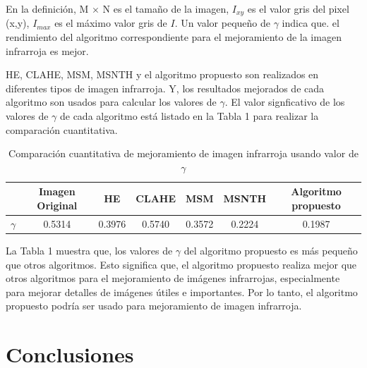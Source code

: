 \documentclass[a4paper, 11 pt, conference]{ieeeconf}      %
\begin{document}
En la definici\'on, M $\times$ N es el tamaño de la imagen, $I_{xy}$ es el valor gris del pixel (x,y), $I_{max}$ es el m\'aximo valor gris de $I$. Un valor pequeño de $\gamma$ indica que. el rendimiento del algoritmo correspondiente para el mejoramiento de la imagen infrarroja es mejor.

HE, CLAHE, MSM, MSNTH y el algoritmo propuesto son realizados en diferentes tipos de imagen infrarroja. Y, los resultados mejorados de cada algoritmo son usados para calcular los valores de  $\gamma$. El valor signficativo de los valores de $\gamma$ de cada algoritmo est\'a listado en la Tabla 1 para realizar la comparaci\'on cuantitativa.

\begin{table}[h]
\centering
\tiny
\caption{Comparaci\'on cuantitativa de mejoramiento de imagen infrarroja usando valor de $\gamma$}
\label{tabla_1}
\begin{center}
\begin{tabular}{ c c c c c c c }
\hline
& \textbf{Imagen Original} & \textbf{HE} & \textbf{CLAHE} & \textbf{MSM} & \textbf{MSNTH} & \textbf{Algoritmo propuesto}\\
\hline
$\gamma$ & 0.5314 & 0.3976 & 0.5740 & 0.3572 & 0.2224 & 0.1987\\
\hline
\end{tabular}
\end{center}
\end{table}
\normalsize

La Tabla 1 muestra que, los valores de $\gamma$ del algoritmo propuesto es m\'as pequeño que otros algoritmos. Esto significa que, el algoritmo propuesto realiza mejor que otros algoritmos para el mejoramiento de im\'agenes infrarrojas, especialmente para mejorar detalles de im\'agenes \'utiles e importantes. Por lo tanto, el algoritmo propuesto podr\'ia ser usado para mejoramiento de imagen infrarroja.

\section{Conclusiones}
\end{document}
